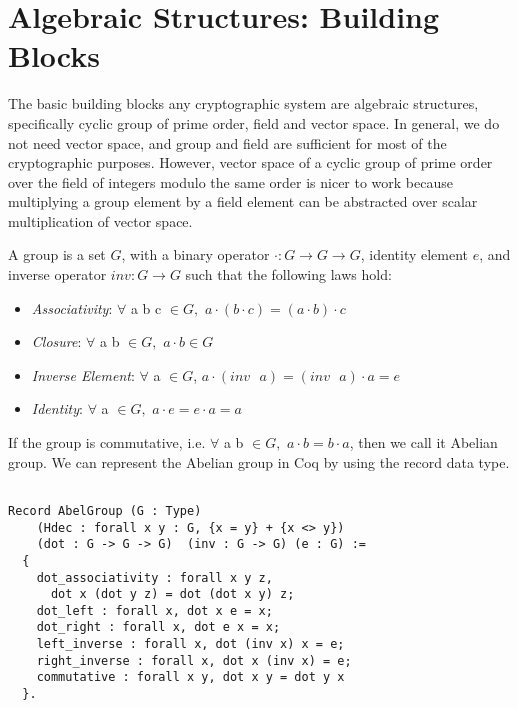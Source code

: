 \section{Algebraic Structures: Building Blocks}
\label{sec:algebra}
The basic building blocks any cryptographic system are algebraic structures, specifically cyclic group of prime order, field and vector space. In general, 
we do not need vector space, and group and field are sufficient for most of the cryptographic purposes. However,
vector space  of a cyclic group of prime order over the field of integers modulo the same order is nicer to work 
because multiplying a group element by a field element can be abstracted over scalar multiplication of vector space.

\begin{definition}[Group] 
A group is a set $G$, with a binary operator $\cdot : G \rightarrow G \rightarrow G$, identity element $e$, and inverse operator $inv : G \rightarrow G$ such 
    that the following laws hold:  \end{definition} 
    \begin{itemize}
     \item \textit{Associativity}: $\forall$  a b c $\in G,$  $a \cdot (b \cdot c) = (a \cdot b) \cdot c$
    \item \textit{Closure}: $\forall$ a b $\in G,$  $a \cdot b \in G$
    \item \textit{Inverse Element}: $\forall$ a $\in G$, $a \cdot (inv \text{ } a) = (inv \text{ } a) \cdot a = e$
    \item \textit{Identity}: $\forall$ a $\in G,$  $a \cdot e = e \cdot a  = a$
    \end{itemize}
  
    \noindent
    If the group is commutative, i.e. $\forall$ a b $\in  G,$  $a \cdot b = b \cdot a$, then we call it Abelian group.  We can represent the Abelian group in Coq by using the 
    record data type. 
 
 \begin{verbatim}

Record AbelGroup (G : Type) 
    (Hdec : forall x y : G, {x = y} + {x <> y}) 
    (dot : G -> G -> G)  (inv : G -> G) (e : G) :=
  {
    dot_associativity : forall x y z, 
      dot x (dot y z) = dot (dot x y) z;
    dot_left : forall x, dot x e = x;
    dot_right : forall x, dot e x = x;
    left_inverse : forall x, dot (inv x) x = e;
    right_inverse : forall x, dot x (inv x) = e;
    commutative : forall x y, dot x y = dot y x
  }.
  
\end{verbatim}


